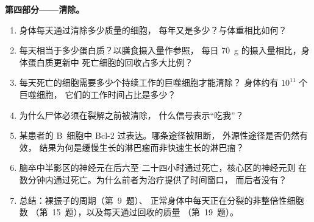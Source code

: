 \begin{problem}
\medskip
\noindent\textbf{第四部分——清除。}
\begin{enumerate}[resume]
  \item 身体每天通过清除多少质量的细胞，
        每年又是多少？与体重相比如何？
  \item 每天相当于多少蛋白质？以膳食摄入量作参照，
        每日 \qty{70}{g} 的摄入量相比，身体蛋白质更新中
        死亡细胞的回收占多大比例？
  \item 每天死亡的细胞需要多少个持续工作的巨噬细胞才能清除？
        身体约有 $10^{11}$ 个巨噬细胞，
        它们的工作时间占比是多少？
  \item 为什么尸体必须在裂解之前被清除，
        什么信号表示“吃我”？
  \item 某患者的 B~细胞中 Bcl-2 过表达。哪条途径被阻断，
        外源性途径是否仍然有效，
        结果为何是缓慢生长的淋巴瘤而非快速生长的淋巴瘤？
  \item 脑卒中半影区的神经元在后六至
        二十四小时通过死亡，核心区的神经元则
        在数分钟内通过死亡。为什么前者为治疗提供了时间窗口，
        而后者没有？
  \item 总结：裸振子的周期（第~9~题）、
        正常身体中每天正在分裂的非整倍性细胞数
        （第~15~题），以及每天通过回收的质量
        （第~19~题）。
\end{enumerate}
\end{problem}

